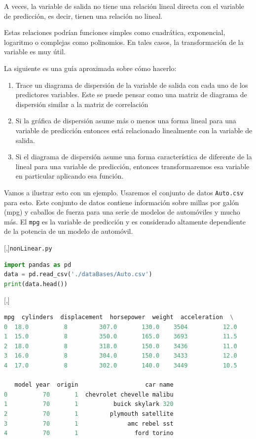 A veces, la variable de salida no tiene una relación lineal directa con el
variable de predicción, es decir, tienen una relación no lineal.


Estas relaciones podrían
funciones simples como cuadrática, exponencial, logaritmo o complejas como
polinomios. En tales casos, la transformación de la variable es muy útil.


La siguiente es una guía aproximada sobre cómo hacerlo:
\begin{enumerate}
 \item
 Trace un diagrama de dispersión de la variable de salida con cada uno de los predictores
variables. Este se puede pensar como una matriz de diagrama de dispersión similar a
la matriz de correlación
\item Si la gráfica de dispersión asume más o menos una forma lineal para una variable de predicción
entonces está relacionado linealmente con la variable de salida.
\item Si el diagrama de dispersión asume una forma característica de diferente de la lineal para una variable de predicción, entonces transformaremos esa variable en particular
aplicando esa función.
\end{enumerate}


Vamos a ilustrar esto con un ejemplo. Usaremos el conjunto de datos \texttt{Auto.csv} para esto.
Este conjunto de datos contiene información sobre millas por galón (mpg) y caballos de fuerza para
una serie de modelos de automóviles y mucho más. El \texttt{mpg} es la variable de predicción y es
considerado altamente dependiente de la potencia de un modelo de automóvil.

[,]{\texttt{nonLinear.py}}
\begin{lstlisting}[language=Python]
import pandas as pd
data = pd.read_csv('./dataBases/Auto.csv')
print(data.head())
\end{lstlisting}

[,]{}

\begin{lstlisting}[language=Python]
    mpg  cylinders  displacement  horsepower  weight  acceleration  \
0  18.0          8         307.0       130.0    3504          12.0
1  15.0          8         350.0       165.0    3693          11.5
2  18.0          8         318.0       150.0    3436          11.0
3  16.0          8         304.0       150.0    3433          12.0
4  17.0          8         302.0       140.0    3449          10.5

   model year  origin                   car name
0          70       1  chevrolet chevelle malibu
1          70       1          buick skylark 320
2          70       1         plymouth satellite
3          70       1              amc rebel sst
4          70       1                ford torino
\end{lstlisting}


